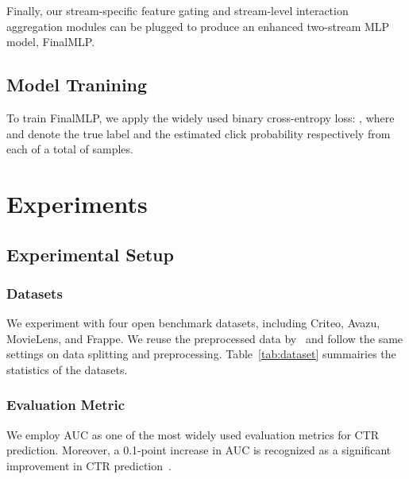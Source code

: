 \documentclass[letterpaper]{article} \usepackage{aaai23}  \usepackage{times}  \usepackage{helvet}  \usepackage{courier}  \usepackage[hyphens]{url}  \usepackage{graphicx} \urlstyle{rm} \def\UrlFont{\rm}  \usepackage{natbib}  \usepackage{caption} \frenchspacing  \setlength{\pdfpagewidth}{8.5in}  \setlength{\pdfpageheight}{11in}  \usepackage{algorithm}
\begin{document}
Finally, our stream-specific feature gating and stream-level interaction aggregation modules can be plugged to produce an enhanced two-stream MLP model, FinalMLP.


\subsection{Model Tranining}
To train FinalMLP, we apply the widely used binary cross-entropy loss:
,
where  and  denote the true label and the estimated click probability respectively from each of a total of  samples.  \section{Experiments}\label{sec:exp}

\subsection{Experimental Setup}

\subsubsection{Datasets}
We experiment with four open benchmark datasets, including Criteo, Avazu, MovieLens, and Frappe. We reuse the preprocessed data by~\cite{AFN} and follow the same settings on data splitting and preprocessing. Table~\ref{tab:dataset} summairies the statistics of the datasets. 






\begin{table}[!t]
\centering
\caption{The statistics of open datasets.}
\label{tab:dataset}
\end{table}



\subsubsection{Evaluation Metric} We employ AUC as one of the most widely used evaluation metrics for CTR prediction. Moreover, a 0.1-point increase in AUC is recognized as a significant improvement in CTR prediction~\cite{WideDeep, AFN, DCN_V2}.
\end{document}
